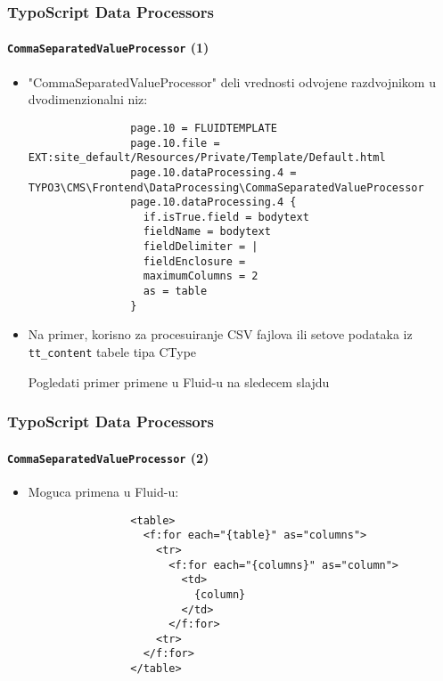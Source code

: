 \begin{frame}[fragile]
	\frametitle{TypoScript Data Processors}
	\framesubtitle{\texttt{CommaSeparatedValueProcessor} (1)}

	\lstset{basicstyle=\tiny\ttfamily}

	\begin{itemize}

		\item "CommaSeparatedValueProcessor" deli vrednosti odvojene razdvojnikom u dvodimenzionalni niz:

			\begin{lstlisting}
				page.10 = FLUIDTEMPLATE
				page.10.file = EXT:site_default/Resources/Private/Template/Default.html
				page.10.dataProcessing.4 = TYPO3\CMS\Frontend\DataProcessing\CommaSeparatedValueProcessor
				page.10.dataProcessing.4 {
				  if.isTrue.field = bodytext
				  fieldName = bodytext
				  fieldDelimiter = |
				  fieldEnclosure =
				  maximumColumns = 2
				  as = table
				}
			\end{lstlisting}

		\item Na primer, korisno za procesuiranje CSV fajlova ili setove podataka iz \texttt{tt\_content} tabele tipa CType

			\vspace{0.2cm}
			\small
				Pogledati primer primene u Fluid-u na sledecem slajdu
			\normalsize

	\end{itemize}

\end{frame}


\begin{frame}[fragile]
	\frametitle{TypoScript Data Processors}
	\framesubtitle{\texttt{CommaSeparatedValueProcessor} (2)}

	\lstset{basicstyle=\tiny\ttfamily}

	\begin{itemize}

		\item Moguca primena u Fluid-u:

			\begin{lstlisting}
				<table>
				  <f:for each="{table}" as="columns">
				    <tr>
				      <f:for each="{columns}" as="column">
				        <td>
				          {column}
				        </td>
				      </f:for>
				    <tr>
				  </f:for>
				</table>
			\end{lstlisting}

	\end{itemize}

\end{frame}

